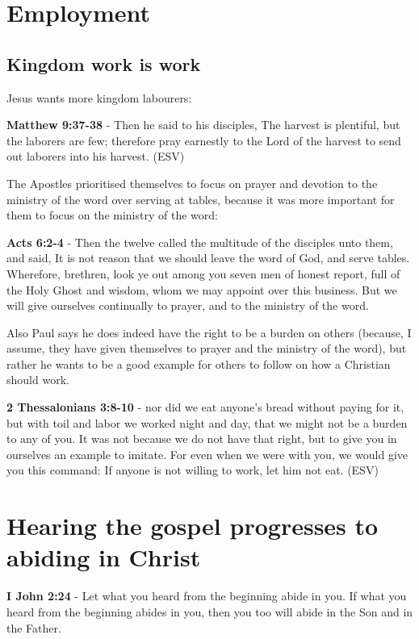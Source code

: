 \documentclass[11pt]{article}
\begin{document}
\section{Employment}
\label{sec:org4e1f79e}
\subsection{Kingdom work \textbf{is} work}
\label{sec:orgeedd325}
Jesus wants more kingdom labourers:

\textbf{Matthew 9:37-38} - Then he said to his disciples, The harvest is plentiful, but the laborers are few; therefore pray earnestly to the Lord of the harvest to send out laborers into his harvest. (ESV)

The Apostles prioritised themselves to focus on prayer and devotion to the ministry of the word over serving at tables, because it was more important for them to focus on the ministry of the word:

\textbf{Acts 6:2-4} - Then the twelve called the multitude of the disciples unto them, and said, It is not reason that we should leave the word of God, and serve tables. Wherefore, brethren, look ye out among you seven men of honest report, full of the Holy Ghost and wisdom, whom we may appoint over this business. But we will give ourselves continually to prayer, and to the ministry of the word.

Also Paul says he does indeed have the right to be a burden on others (because, I assume, they have given themselves to prayer and the ministry of the word), but rather he wants to be a good example for others to follow on how a Christian should work.

\textbf{2 Thessalonians 3:8-10} - nor did we eat anyone's bread without paying for it, but with toil and labor we worked night and day, that we might not be a burden to any of you. It was not because we do not have that right, but to give you in ourselves an example to imitate. For even when we were with you, we would give you this command: If anyone is not willing to work, let him not eat. (ESV)

\section{Hearing the gospel progresses to abiding in Christ}
\label{sec:orge8306a7}
\textbf{I John 2:24} - Let what you heard from the beginning abide in you. If what you heard from the beginning abides in you, then you too will abide in the Son and in the Father.
\end{document}
